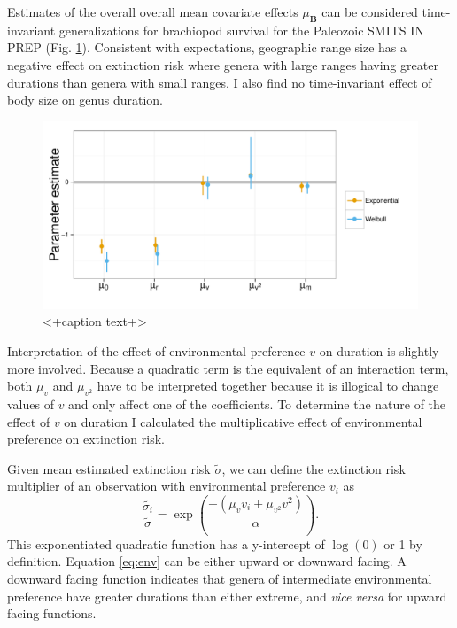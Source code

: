 \documentclass[12pt,letterpaper]{article}
\begin{document}
Estimates of the overall overall mean covariate effects \(\mu_{\mathbf{B}}\) can be considered time-invariant generalizations for brachiopod survival for the Paleozoic \uppercase{Smits in prep} (Fig. \ref{fig:mu}). Consistent with expectations, geographic range size has a negative effect on extinction risk where genera with large ranges having greater durations than genera with small ranges. I also find no time-invariant effect of body size on genus duration. 
\begin{figure}[ht]
  \centering
  \includegraphics[height = 0.5\textheight,width=\textwidth,keepaspectratio=true]{figure/coef_means}
  \caption{<+caption text+>}
  \label{fig:mu}
\end{figure}

Interpretation of the effect of environmental preference \(v\) on duration is slightly more involved. Because a quadratic term is the equivalent of an interaction term, both \(\mu_{v}\) and \(\mu_{v^{2}}\) have to be interpreted together because it is illogical to change values of \(v\) and only affect one of the coefficients. To determine the nature of the effect of \(v\) on duration I calculated the multiplicative effect of environmental preference on extinction risk.

Given mean estimated extinction risk \(\tilde{\sigma}\), we can define the extinction risk multiplier of an observation with environmental preference \(v_{i}\) as 
\begin{equation}
  \frac{\tilde{\sigma_{i}}}{\tilde{\sigma}} = \exp\left(\frac{-(\mu_{v} v_{i} + \mu_{v^{2}} v^{2})}{\alpha}\right).
  \label{eq:env}
\end{equation}
This exponentiated quadratic function has a y-intercept of \(\log(0)\) or 1 by definition. Equation \ref{eq:env} can be either upward or downward facing. A downward facing function indicates that genera of intermediate environmental preference have greater durations than either extreme, and \textit{vice versa} for upward facing functions.
\end{document}
